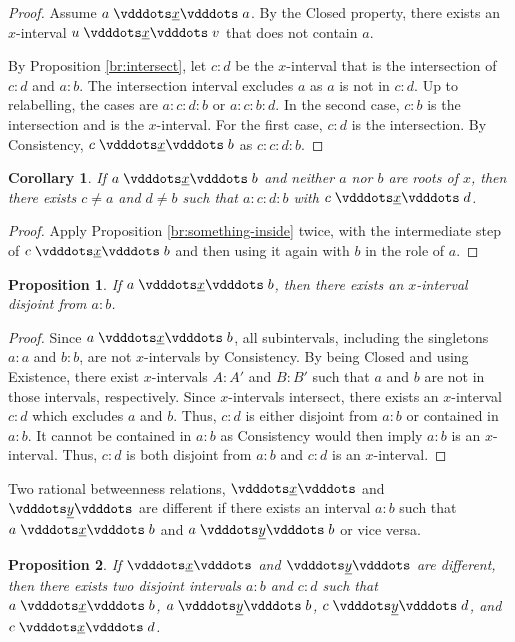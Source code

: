 \documentclass[12pt]{article}
\newtheorem{corollary}{Corollary}[section]
\newtheorem{proposition}{Proposition}[section]
\begin{document}
\begin{proof}
    Assume \sout{$a \xrel a$}. By the Closed property, there exists an $x$-interval $u \xrel v$ that does not contain $a$.

    By Proposition \ref{br:intersect}, let $c:d$ be the $x$-interval that is the intersection of $c:d$ and $a:b$. The intersection interval excludes $a$ as $a$ is not in $c:d$. Up to relabelling, the cases are $a:c:d:b$ or $a:c:b:d$. In the second case, $c:b$ is the intersection and is the $x$-interval. For the first case, $c:d$ is the intersection. By Consistency, $c \xrel b$ as $c:c:d:b$. 
\end{proof}

\begin{corollary}\label{br:doublesomething-inside}
    If $a \xrel b$ and neither $a$ nor $b$ are roots of $x$, then there exists $c \neq a$ and $d \neq b$ such that $a : c : d : b$ with $c \xrel d$. 
\end{corollary}

\begin{proof}
Apply Proposition \ref{br:something-inside} twice, with the intermediate step of $c \xrel b$ and then using it again with $b$ in the role of $a$. 
\end{proof}


\begin{proposition}\label{br:something-outside}
    If \sout{$a \xrel b$}, then there exists an $x$-interval disjoint from $a:b$.
\end{proposition}

\begin{proof}
    Since \sout{$a \xrel b$}, all subintervals, including the singletons $a:a$ and $b:b$, are not $x$-intervals by Consistency. By being Closed and using Existence, there exist $x$-intervals $A:A'$ and $B:B'$ such that $a$ and $b$ are not in those intervals, respectively. Since $x$-intervals intersect, there exists an $x$-interval $c:d$ which excludes $a$ and $b$. Thus, $c:d$ is either disjoint from $a:b$ or contained in $a:b$. It cannot be contained in $a:b$ as Consistency would then imply $a:b$ is an $x$-interval. Thus, $c:d$ is both disjoint from $a:b$ and $c:d$ is an $x$-interval.
\end{proof}


Two rational betweenness relations, $\xrel$ and $\xrel[y]$ are different if there exists an interval $a:b$ such that $a \xrel b$ and \sout{$a \xrel[y] b$} or vice versa. 

\begin{proposition}\label{br:different}
    If $\xrel$ and $\xrel[y]$ are different, then there exists two disjoint intervals $a:b$ and $c:d$ such that $a \xrel b$, \sout{$a \xrel[y] b$}, $c \xrel[y] d$, and \sout{$c \xrel d$}.
\end{proposition}
\end{document}
